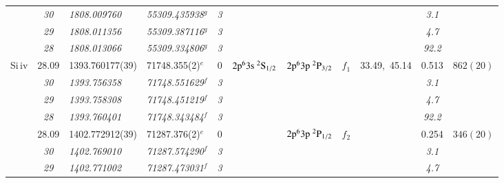 \documentclass[useAMS,usenatbib]{mn2e}
\begin{document}
\begin{table*}
\begin{center}
\begin{minipage}{0.977\textwidth}
\begin{tabular}{lcllcllcccc}
              & \it{30}&\it{1808.009760}    & \it{55309.435938}$^g$    &\it{3}&                                            &                                                    &        &              & \it{3.1}& $          $\\
              & \it{29}&\it{1808.011356}    & \it{55309.387116}$^g$    &\it{3}&                                            &                                                    &        &              & \it{4.7}& $          $\\
              & \it{28}&\it{1808.013066}    & \it{55309.334806}$^g$    &\it{3}&                                            &                                                    &        &              &\it{92.2}& $          $\\
Si{\sc \,iv}  & 28.09  & 1393.760177(39)    & 71748.355(2)$^e$         & 0    & $2\rm{p}^63\rm{s}~^2\rm{S}_{1/2}$          & $2\rm{p}^63\rm{p}~^2\rm{P}_{3/2}$                  & $f_1$  & 33.49,~45.14 &  0.513  & $  862(20) $\\
              & \it{30}& \it{1393.756358}   & \it{71748.551629}$^f$    &\it{3}&                                            &                                                    &        &              & \it{3.1}& $          $\\
              & \it{29}& \it{1393.758308}   & \it{71748.451219}$^f$    &\it{3}&                                            &                                                    &        &              & \it{4.7}& $          $\\
              & \it{28}& \it{1393.760401}   & \it{71748.343484}$^f$    &\it{3}&                                            &                                                    &        &              &\it{92.2}& $          $\\
              & 28.09  & 1402.772912(39)    & 71287.376(2)$^e$         & 0    &                                            & $2\rm{p}^63\rm{p}~^2\rm{P}_{1/2}$                  & $f_2$  &              &  0.254  & $  346(20) $\\
              & \it{30}& \it{1402.769010}   & \it{71287.574290}$^f$    &\it{3}&                                            &                                                    &        &              & \it{3.1}& $          $\\
              & \it{29}& \it{1402.771002}   & \it{71287.473031}$^f$    &\it{3}&                                            &                                                    &        &              & \it{4.7}& $          $\\

\end{tabular}
\end{minipage}
\end{center}
\end{table*}
\end{document}
